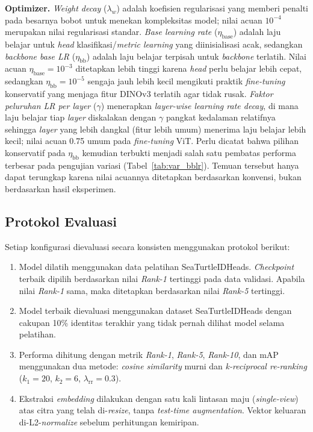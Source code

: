 \textbf{Optimizer.} \textit{Weight decay} ($\lambda_w$) adalah koefisien regularisasi yang memberi penalti pada besarnya bobot untuk menekan kompleksitas model; nilai acuan $10^{-4}$ merupakan nilai regularisasi standar. \textit{Base learning rate} ($\eta_{\text{base}}$) adalah laju belajar untuk \textit{head} klasifikasi/\textit{metric learning} yang diinisialisasi acak, sedangkan \textit{backbone base LR} ($\eta_{\text{bb}}$) adalah laju belajar terpisah untuk \textit{backbone} terlatih. Nilai acuan $\eta_{\text{base}}=10^{-3}$ ditetapkan lebih tinggi karena \textit{head} perlu belajar lebih cepat, sedangkan $\eta_{\text{bb}}=10^{-5}$ sengaja jauh lebih kecil mengikuti praktik \textit{fine-tuning} konservatif yang menjaga fitur DINOv3 terlatih agar tidak rusak. \textit{Faktor peluruhan LR per layer} ($\gamma$) menerapkan \textit{layer-wise learning rate decay}, di mana laju belajar tiap \textit{layer} diskalakan dengan $\gamma$ pangkat kedalaman relatifnya sehingga \textit{layer} yang lebih dangkal (fitur lebih umum) menerima laju belajar lebih kecil; nilai acuan 0.75 umum pada \textit{fine-tuning} ViT. Perlu dicatat bahwa pilihan konservatif pada $\eta_{\text{bb}}$ kemudian terbukti menjadi salah satu pembatas performa terbesar pada pengujian variasi (Tabel~\ref{tab:var_bblr}). Temuan tersebut hanya dapat terungkap karena nilai acuannya ditetapkan berdasarkan konvensi, bukan berdasarkan hasil eksperimen.

\subsection{Protokol Evaluasi}
\label{subsec:protokol_evaluasi}

Setiap konfigurasi dievaluasi secara konsisten menggunakan protokol berikut:

\begin{enumerate}
    \item Model dilatih menggunakan data pelatihan SeaTurtleIDHeads. \textit{Checkpoint} terbaik dipilih berdasarkan nilai \textit{Rank-1} tertinggi pada data validasi. Apabila nilai \textit{Rank-1} sama, maka ditetapkan berdasarkan nilai \textit{Rank-5} tertinggi.
    \item Model terbaik dievaluasi menggunakan dataset SeaTurtleIDHeads dengan cakupan 10\% identitas terakhir yang tidak pernah dilihat model selama pelatihan.
    \item Performa dihitung dengan metrik \textit{Rank-1}, \textit{Rank-5}, \textit{Rank-10}, dan mAP menggunakan dua metode: \textit{cosine similarity} murni dan \textit{k-reciprocal re-ranking} ($k_1=20$, $k_2=6$, $\lambda_{\text{rr}}=0{.}3$).
    \item Ekstraksi \textit{embedding} dilakukan dengan satu kali lintasan maju (\textit{single-view}) atas citra yang telah di-\textit{resize}, tanpa \textit{test-time augmentation}. Vektor keluaran di-L2-\textit{normalize} sebelum perhitungan kemiripan.
\end{enumerate}

